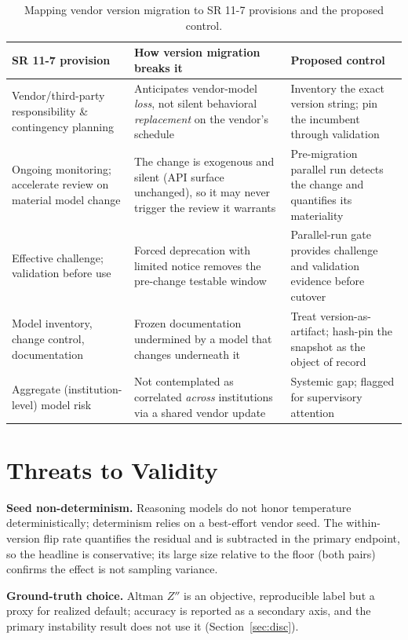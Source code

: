 \documentclass[10pt,twocolumn]{article}
\begin{document}
\begin{table}[t]
\centering
\caption{Mapping vendor version migration to SR 11-7 provisions and the proposed control.}
\label{tab:gov}
\small
\begin{tabular}{@{}p{}p{}p{}@{}}
\toprule
SR 11-7 provision & How version migration breaks it & Proposed control \\
\midrule
Vendor/third-party responsibility \& contingency planning & Anticipates vendor-model \emph{loss}, not silent behavioral \emph{replacement} on the vendor's schedule & Inventory the exact version string; pin the incumbent through validation \\
Ongoing monitoring; accelerate review on material model change & The change is exogenous and silent (API surface unchanged), so it may never trigger the review it warrants & Pre-migration parallel run detects the change and quantifies its materiality \\
Effective challenge; validation before use & Forced deprecation with limited notice removes the pre-change testable window & Parallel-run gate provides challenge and validation evidence before cutover \\
Model inventory, change control, documentation & Frozen documentation undermined by a model that changes underneath it & Treat version-as-artifact; hash-pin the snapshot as the object of record \\
Aggregate (institution-level) model risk & Not contemplated as correlated \emph{across} institutions via a shared vendor update & Systemic gap; flagged for supervisory attention \\
\bottomrule
\end{tabular}
\end{table}

\section{Threats to Validity}
\noindent\textbf{Seed non-determinism.} Reasoning models do not honor temperature deterministically; determinism relies on a best-effort vendor seed. The within-version flip rate quantifies the residual and is subtracted in the primary endpoint, so the headline is conservative; its large size relative to the floor (both pairs) confirms the effect is not sampling variance.

\noindent\textbf{Ground-truth choice.} Altman $Z''$ is an objective, reproducible label but a proxy for realized default; accuracy is reported as a secondary axis, and the primary instability result does not use it (Section~\ref{sec:disc}).
\end{document}
